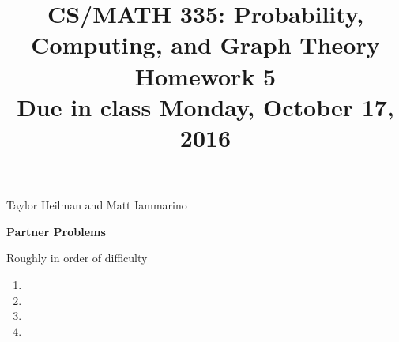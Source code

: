 \documentclass[11pt]{amsart}
\begin{document}
\title[CS/MATH 335 HW 2]{CS/MATH 335: Probability, Computing, and Graph Theory \\ Homework 5\\ Due in class Monday, October 17, 2016}
\maketitle

{Taylor Heilman and Matt Iammarino}

\textbf{Partner Problems}

Roughly in order of difficulty

\begin{enumerate}

\item {} 
{

}

\item {}

{





}

\item {}

{


}
\item {}

{

}
\end{enumerate}
\end{document}
